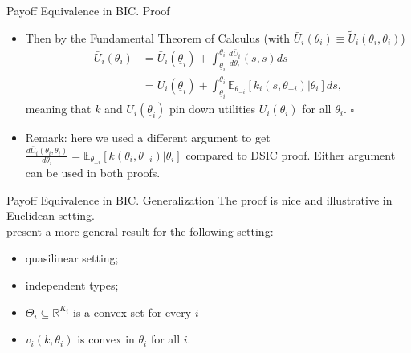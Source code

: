 \documentclass[english,10pt
,aspectratio=169
]{beamer}
\begin{document}
\begin{frame}{Payoff Equivalence in BIC. Proof}
	\begin{itemize}
		\item Then by the Fundamental Theorem of Calculus (with $\bar{U}_i (\theta_i) \equiv \tilde{U}_i (\theta_i,\theta_i)$)
		\begin{align*}
		\bar{U}_i (\theta_i) &= \bar{U}_i (\underline{\theta}_i) + \int_{\underline{\theta}_i}^{\theta_i} \frac{d \bar{U}_i}{d \theta_i}(s,s) d s
		\\&= \bar{U}_i (\underline{\theta}_i) + \int_{\underline{\theta}_i}^{\theta_i} \mathbb{E}_{\theta_{-i}} \left[k_i(s,\theta_{-i}) | \theta_i \right] d s,
		\end{align*}
		meaning that $k$ and $\bar{U}_i (\underline{\theta}_i)$ pin down utilities $\bar{U}_i (\theta_i)$ for all $\theta_i$. $\square$
		\medskip
		\item Remark: here we used a different argument to get $\frac{d \bar{U}_i (\theta_i,\theta_{i})}{d \theta_i} = \mathbb{E}_{\theta_{-i}} \left[k(\theta_i,\theta_{-i}) | \theta_i \right]$ compared to DSIC proof. Either argument can be used in both proofs.
	\end{itemize}
\end{frame}


\begin{frame}{Payoff Equivalence in BIC. Generalization}
	The proof is nice and illustrative in Euclidean setting.\\
	\cite{krishna_convex_2001} present a more general result for the following setting:
	\begin{itemize}
		\item quasilinear setting;
		\item independent types;
		\item $\Theta_i \subseteq \mathbb{R}^{K_i}$ is a convex set for every $i$ 
		\item $v_i(k,\theta_i)$ is convex in $\theta_i$ for all $i$.
	\end{itemize}
\end{frame}
\end{document}
